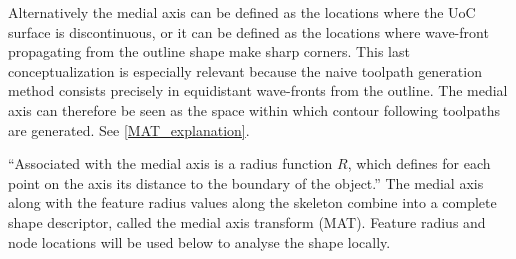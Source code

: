 Alternatively the medial axis can be defined as the locations where the UoC surface is discontinuous,
or it can be defined as the locations where wave-front propagating from the outline shape make sharp corners. \cite{blum1967transformation}
This last conceptualization is especially relevant because the naive toolpath generation method consists precisely in equidistant wave-fronts from the outline.
The medial axis can therefore be seen as the space within which contour following toolpaths are generated.
See \cref{MAT_explanation}.

``Associated with the medial axis is a radius function $R$, which defines for each point on the axis its distance to the boundary of the object.'' \cite{lee1982medial}
The medial axis along with the feature radius values along the skeleton combine into a complete shape descriptor, called the medial axis transform (MAT).
Feature radius and node locations will be used below to analyse the shape locally.



